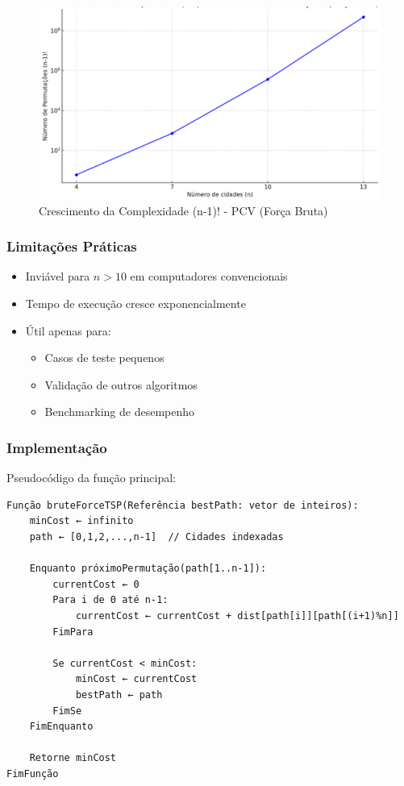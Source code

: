 \begin{figure}[H]
    \centering
    \includegraphics[width=.7\textwidth]{images/crescimento_complexidade.png}
    \caption{Crescimento da Complexidade (n-1)! - PCV (Força Bruta)}
    \label{fig:aa}
    \end{figure}

\subsubsection{Limitações Práticas}
\begin{itemize}
\item Inviável para $n > 10$ em computadores convencionais
\item Tempo de execução cresce exponencialmente
\item Útil apenas para:
  \begin{itemize}
  \item Casos de teste pequenos
  \item Validação de outros algoritmos
  \item Benchmarking de desempenho
  \end{itemize}
\end{itemize}

\subsubsection{Implementação}
Pseudocódigo da função principal:

\begin{verbatim}
Função bruteForceTSP(Referência bestPath: vetor de inteiros):
    minCost ← infinito
    path ← [0,1,2,...,n-1]  // Cidades indexadas
    
    Enquanto próximoPermutação(path[1..n-1]):
        currentCost ← 0
        Para i de 0 até n-1:
            currentCost ← currentCost + dist[path[i]][path[(i+1)%n]]
        FimPara
        
        Se currentCost < minCost:
            minCost ← currentCost
            bestPath ← path
        FimSe
    FimEnquanto
    
    Retorne minCost
FimFunção
\end{verbatim}

